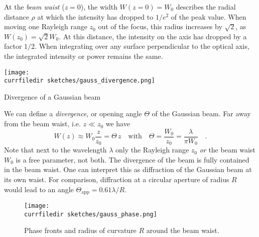 At the \emph{beam waist} ($z=0$), the width $W(z=0) = W_0$ describes the radial distance $\rho$ at which the intensity  has dropped to $1/e^2$ of the peak value. When moving one Rayleigh range $z_0$ out of the focus, this radius increases by $\sqrt{2}$, as $W(z_0) = \sqrt{2} W_0$. At this distance, the intensity on the axis has dropped by a factor $1/2$. When integrating over any surface perpendicular to the optical axis, the integrated intensity or power remains the same.

\begin{marginfigure}
    \texttt{[image: \\currfiledir sketches/gauss\_divergence.png]}
   \caption{Divergence of a Gaussian beam}
\end{marginfigure}


We can define a \emph{divergence}, or opening angle $\Theta$ of the Gaussian beam. Far away from the beam waist, i.e. $z \ll z_0$ we have
\begin{equation}
    W(z) \approx W_0 \frac{z}{z_0} = \Theta \, z \quad \text{with} \quad \Theta = \frac{W_0}{z_0} = \frac{\lambda}{\pi W_0} \quad .
 \end{equation}
 Note that next to the wavelength $\lambda$ only the Rayleigh range $z_0$ \emph{or} the beam waist $W_0$ is a free parameter, not both. The divergence of the beam is fully contained in the beam waist. One can interpret this as diffraction of the Gaussian beam at its own waist. For comparison, diffraction at a circular aperture of radius $R$ would  lead to an angle $\Theta_\text{app} = 0.61 \lambda  / R$.

 \begin{figure}
    \texttt{[image: \\currfiledir sketches/gauss\_phase.png]}
   \caption{Phase fronts and radius of curvature $R$ around the beam waist.}
\end{figure}


